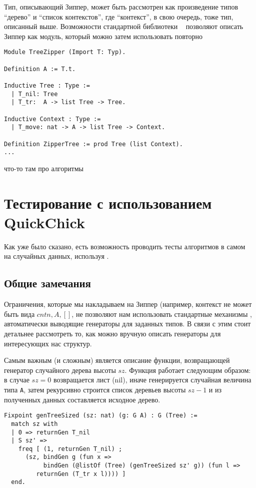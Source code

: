 Тип, описывающий Зиппер, может быть рассмотрен как произведение типов ``дерево'' и ``список контекстов'', где ``контекст'', в свою очередь, тоже тип, описанный выше. Возможности стандартной библиотеки \tcoq~ позволяют описать Зиппер как модуль, который можно затем использовать повторно

\begin{lstlisting}
Module TreeZipper (Import T: Typ).

Definition A := T.t.

Inductive Tree : Type :=
  | T_nil: Tree
  | T_tr:  A -> list Tree -> Tree.

Inductive Context : Type :=
  | T_move: nat -> A -> list Tree -> Context.

Definition ZipperTree := prod Tree (list Context).
...
\end{lstlisting}
что-то там про алгоритмы

\section{Тестирование с использованием QuickChick}

Как уже было сказано, есть возможность проводить тесты алгоритмов в самом \tcoq~ на случайных данных, используя \tqc.

\subsection{Общие замечания}

Ограничения, которые мы накладываем на Зиппер (например, контекст не может быть вида $cnt n, A, [
]$, не позволяют нам использовать стандартные механизмы \tqc, автоматически выводящие генераторы для заданных типов. В связи с этим стоит детальнее рассмотреть то, как можно вручную описать генераторы для интересующих нас структур.

Самым важным (и сложным) является описание функции, возвращающей генератор случайного дерева высоты $sz$. Функция работает следующим образом: в случае $sz  = 0$ возвращается лист (nil), иначе генерируется случайная величина типа \texttt{A}, затем рекурсивно строится список деревьев высоты $sz - 1$ и из полученных данных составляется исходное дерево.

\begin{lstlisting}
Fixpoint genTreeSized (sz: nat) (g: G A) : G (Tree) :=
  match sz with
  | 0 => returnGen T_nil
  | S sz' =>
    freq [ (1, returnGen T_nil) ;
      (sz, bindGen g (fun x =>
           bindGen (@listOf (Tree) (genTreeSized sz' g)) (fun l =>
         returnGen (T_tr x l)))) ]
  end.
\end{lstlisting}


